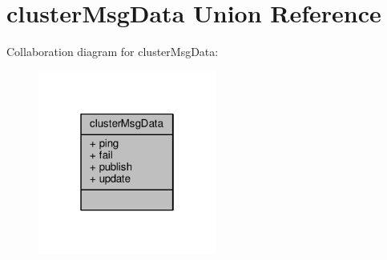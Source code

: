 \hypertarget{unionclusterMsgData}{}\section{cluster\+Msg\+Data Union Reference}
\label{unionclusterMsgData}


Collaboration diagram for cluster\+Msg\+Data\+:\nopagebreak
\begin{figure}[H]
\begin{center}
\leavevmode
\includegraphics[width=166pt]{unionclusterMsgData__coll__graph}
\end{center}
\end{figure}
